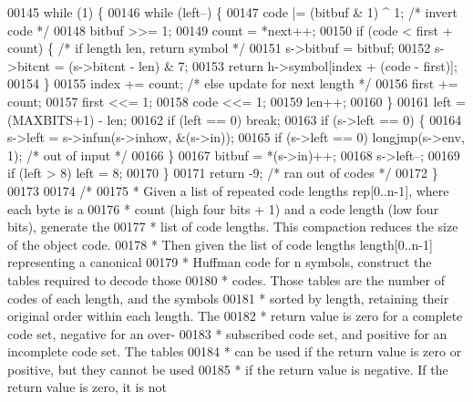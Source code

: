 \begin{DoxyCode}
00145     \textcolor{keywordflow}{while} (1) \{
00146         \textcolor{keywordflow}{while} (left--) \{
00147             code |= (bitbuf & 1) ^ 1;   \textcolor{comment}{/* invert code */}
00148             bitbuf >>= 1;
00149             count = *next++;
00150             \textcolor{keywordflow}{if} (code < first + count) \{ \textcolor{comment}{/* if length len, return symbol */}
00151                 s->bitbuf = bitbuf;
00152                 s->bitcnt = (s->bitcnt - len) & 7;
00153                 \textcolor{keywordflow}{return} h->symbol[index + (code - first)];
00154             \}
00155             index += count;             \textcolor{comment}{/* else update for next length */}
00156             first += count;
00157             first <<= 1;
00158             code <<= 1;
00159             len++;
00160         \}
00161         left = (MAXBITS+1) - len;
00162         \textcolor{keywordflow}{if} (left == 0) \textcolor{keywordflow}{break};
00163         \textcolor{keywordflow}{if} (s->left == 0) \{
00164             s->left = s->infun(s->inhow, &(s->in));
00165             \textcolor{keywordflow}{if} (s->left == 0) longjmp(s->env, 1);       \textcolor{comment}{/* out of input */}
00166         \}
00167         bitbuf = *(s->in)++;
00168         s->left--;
00169         \textcolor{keywordflow}{if} (left > 8) left = 8;
00170     \}
00171     \textcolor{keywordflow}{return} -9;                          \textcolor{comment}{/* ran out of codes */}
00172 \}
00173 
00174 \textcolor{comment}{/*}
00175 \textcolor{comment}{ * Given a list of repeated code lengths rep[0..n-1], where each byte is a}
00176 \textcolor{comment}{ * count (high four bits + 1) and a code length (low four bits), generate the}
00177 \textcolor{comment}{ * list of code lengths.  This compaction reduces the size of the object code.}
00178 \textcolor{comment}{ * Then given the list of code lengths length[0..n-1] representing a canonical}
00179 \textcolor{comment}{ * Huffman code for n symbols, construct the tables required to decode those}
00180 \textcolor{comment}{ * codes.  Those tables are the number of codes of each length, and the symbols}
00181 \textcolor{comment}{ * sorted by length, retaining their original order within each length.  The}
00182 \textcolor{comment}{ * return value is zero for a complete code set, negative for an over-}
00183 \textcolor{comment}{ * subscribed code set, and positive for an incomplete code set.  The tables}
00184 \textcolor{comment}{ * can be used if the return value is zero or positive, but they cannot be used}
00185 \textcolor{comment}{ * if the return value is negative.  If the return value is zero, it is not}

\end{DoxyCode}
